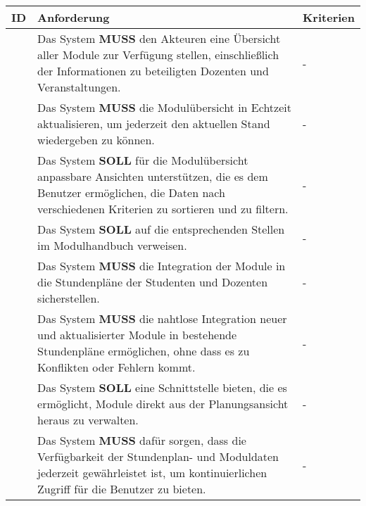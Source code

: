 \newpage

\begin{tabular} {|p{}|p{}|p{}|}
	\hline
	ID & Anforderung & Kriterien \\
	\hline
	\printfreqnr
	& Das System \textbf{MUSS} den Akteuren eine Übersicht aller Module zur Verfügung stellen, einschließlich der Informationen zu beteiligten Dozenten und Veranstaltungen. 
	& - \\
	\hline
	\printfreqnr
	& Das System \textbf{MUSS} die Modulübersicht in Echtzeit aktualisieren, um jederzeit den aktuellen Stand wiedergeben zu können. 
	& - \\
	\hline
	\printfreqnr
	& Das System \textbf{SOLL} für die Modulübersicht anpassbare Ansichten unterstützen, die es dem Benutzer ermöglichen, die Daten nach verschiedenen Kriterien zu sortieren und zu filtern. 
	& - \\
	\hline
	\printfreqnr
	& Das System \textbf{SOLL} auf die entsprechenden Stellen im Modulhandbuch verweisen. 
	& - \\
	\hline
	\printfreqnr
	& Das System \textbf{MUSS} die Integration der Module in die Stundenpläne der Studenten und Dozenten sicherstellen. 
	& - \\
	\hline
	\printfreqnr
	& Das System \textbf{MUSS} die nahtlose Integration neuer und aktualisierter Module in bestehende Stundenpläne ermöglichen, ohne dass es zu Konflikten oder Fehlern kommt. 
	& - \\
	\hline
	\printfreqnr
	& Das System \textbf{SOLL} eine Schnittstelle bieten, die es ermöglicht, Module direkt aus der Planungsansicht heraus zu verwalten. 
	& - \\
	\hline
	\printfreqnr
	& Das System \textbf{MUSS} dafür sorgen, dass die Verfügbarkeit der Stundenplan- und Moduldaten jederzeit gewährleistet ist, um kontinuierlichen Zugriff für die Benutzer zu bieten. 
	& - \\
	\hline
\end{tabular}

